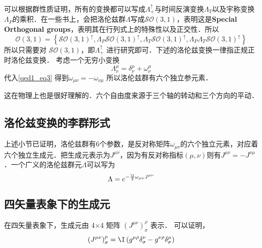 可以根据群性质证明，所有的变换都可以写成$\Lambda_{+}^{\uparrow}$与时间反演变换$ \Lambda_{T}$以及宇称变换$\Lambda_{P}$的乘积．在一些书上，会把洛伦兹群$\Lambda$写成$\mathcal{S O}(3,1)$，表明这是\textbf{Special Orthogonal groups}，表明其在行列式上的特殊性以及正交性．所以$$\mathcal{O}(3,1)=\left\{\mathcal{S O}(3,1)^{\uparrow}, \Lambda_{P} \mathcal{S O}(3,1)^{\uparrow}, \Lambda_{T} \mathcal{S O}(3,1)^{\uparrow}, \Lambda_{P} \Lambda_{T} \mathcal{S O}(3,1)^{\uparrow}\right\}$$所以只需要对 $\mathcal{S O}(3,1)$，即$\Lambda_{+}^{\uparrow}$ 进行研究即可．下述的洛伦兹变换一律指正规正时洛伦兹变换．
考虑一个无穷小变换
\begin{equation}\Lambda_{\nu}^{\mu}=\delta_{\nu}^{\mu}+\omega_{\nu}^{\mu}\end{equation}
代入\autoref{qed1_eq3} 得到$\omega_{\mu \nu}=-\omega_{\nu \mu}$
所以洛伦兹群有六个独立参元素．

这在物理上也是很好理解的．六个自由度来源于三个轴的转动和三个方向的平动．
\subsection{洛伦兹变换的李群形式}
上述小节已证明，洛伦兹群有6个参数，是反对称矩阵$\omega_{\mu\nu}$的六个独立元素，对应着六个独立生成元．把生成元表示为$J^{\mu\nu}$，因为有反对称指标$(\mu,\nu)$则有$J^{\mu\nu}=-J^{\nu\mu}$．一个广义的洛伦兹群元$\Lambda$可以写为
\begin{equation}
\Lambda=e^{-\frac{\I}{2} \omega_{\mu\nu}J^{\mu\nu}}
\end{equation}
\subsection{四矢量表象下的生成元}
在四矢量表象下，生成元由 4×4 矩阵 $(J^{\mu\nu})_\sigma^\rho$ 表示．
可以证明，
\begin{equation}\left(J^{\mu \nu}\right)_{\sigma}^{\rho}=\I\left(g^{\mu \rho} \delta_{\sigma}^{\nu}-g^{\nu \rho} \delta_{\sigma}^{\mu}\right)\end{equation}
